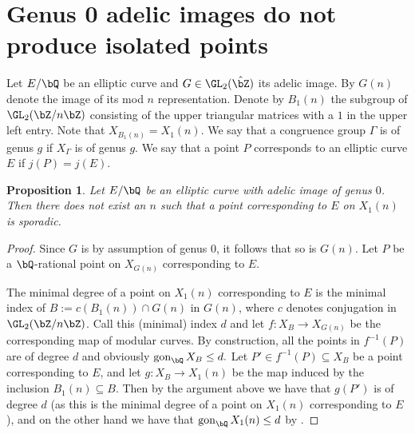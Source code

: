 \documentclass[11pt,reqno]{amsart}
\theoremstyle{plain}
\newtheorem{proposition}[theorem]{Proposition}
\theoremstyle{definition}
\DeclareMathOperator{\gon}{gon}
\newcommand{\Q}{\bQ}
\newcommand{\Z}{\bZ}
\begin{document}
\section{Genus 0 adelic images do not produce isolated points}

Let $E/ \Q$ be an elliptic curve and $G\in \GL_2(\hat \Z)$ its adelic image. By $G(n)$ denote the image of its mod $n$ representation. Denote by $B_1(n)$ the subgroup of $\GL_2(\Z /n \Z)$ consisting of the upper triangular matrices with a $1$ in the upper left entry. Note that $X_{B_1(n)}=X_1(n)$. We say that a congruence group $\Gamma$ is of genus $g$ if $X_\Gamma$ is of genus $g$. We say that a point $P$ corresponds to an elliptic curve $E$ if $j(P)=j(E)$.

\begin{proposition}
Let $E/\Q$ be an elliptic curve with adelic image of genus $0$. Then there does not exist an $n$ such that a point corresponding to $E$ on $X_1(n)$ is sporadic.
\end{proposition}
\begin{proof}
Since $G$ is by assumption of genus $0$, it follows that so is $G(n)$. Let $P$ be a $\Q$-rational point on $X_{G(n)}$ corresponding to $E$. 


The minimal degree of a point on $X_1(n)$ corresponding to $E$ is the minimal index of $B:=c(B_1(n))\cap G(n)$ in $G(n)$, where $c$ denotes conjugation in $\GL_2(\Z /n \Z)$. 
Call this (minimal) index $d$ and let $f:X_{B}\rightarrow X_{G(n)}$ be the corresponding map of modular curves. By construction, all the points in $f^{-1}(P)$ are of degree $d$ and obviously $\gon_\Q X_{B}\leq d.$ Let $P'\in f^{-1}(P) \subseteq X_{B}$ be a point corresponding to $E$, and let $g:X_{B}\rightarrow X_1(n)$ be the map induced by the inclusion $B_1(n) \subseteq B$. Then by the argument above we have that $g(P')$ is of degree $d$ (as this is the minimal degree of a point on $X_1(n)$ corresponding to $E$), and on the other hand we have that $\gon_\Q X_1(n)\leq d$ by \cite[Proposition A.1 (vii)]{Poonen:gonality}.
\end{proof}


\vspace{20 mm}


\end{document}
